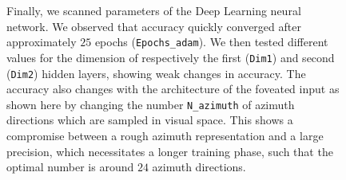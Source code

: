 \begin{figure}[t!]
{\B Finally, we scanned parameters of the Deep Learning neural network. We observed that accuracy quickly converged after approximately $25$ epochs (\texttt{Epochs\_adam}). We then tested different values for the dimension of respectively the first (\texttt{Dim1}) and second (\texttt{Dim2}) hidden layers, showing weak changes in accuracy. %
\C
The accuracy also changes with the architecture of the foveated input as shown here by changing the number \texttt{N\_azimuth} of azimuth directions which are sampled in visual space. This shows a compromise between a rough azimuth representation and a large precision, which necessitates a longer training phase, such that the optimal number is around $24$ azimuth directions. %
\label{fig:params}}%
\end{figure}%

